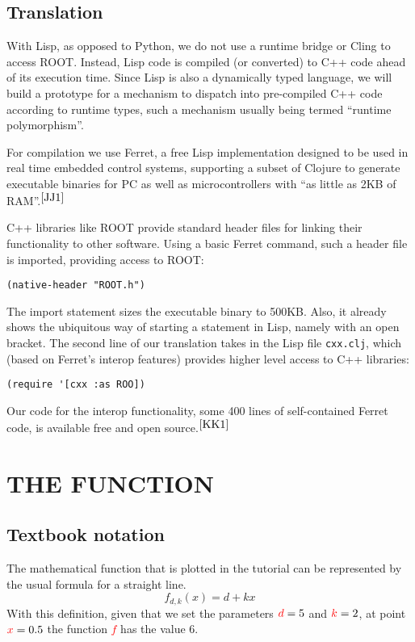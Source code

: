 \documentclass[twocolumn]{article}
\begin{document}
\subsection{Translation}
With Lisp, as opposed to Python, we do not use a runtime bridge or Cling to access ROOT. Instead, Lisp code is compiled (or converted) to C++ code ahead of its execution time. Since Lisp is also a dynamically typed language, we will build a prototype for a mechanism to dispatch into pre-compiled C++ code according to runtime types, such a mechanism usually being termed “runtime polymorphism”.

For compilation we use Ferret, a free Lisp implementation designed to be used in real time embedded control systems, supporting a subset of Clojure  to generate executable binaries for PC as well as microcontrollers with “as little as 2KB of RAM”.$^{\cite{JJ1}}$

C++ libraries like ROOT provide standard header files for linking their functionality to other software. Using a basic Ferret command, such a header file is imported, providing access to ROOT:
{\color{blue}\begin{verbatim}
(native-header "ROOT.h")
\end{verbatim}}
The import statement sizes the executable binary to 500KB. Also, it already shows the ubiquitous way of starting a statement in Lisp, namely with an open bracket. The second line of our translation takes in the Lisp file \texttt{cxx.clj}, which (based on Ferret’s interop features) provides higher level access to C++ libraries:
{\color{blue}\begin{verbatim}
(require '[cxx :as ROO])
\end{verbatim}}
Our code for the interop functionality, some 400 lines of self-contained Ferret code, is available free and open source.$^{\cite{KK1}}$

\section{THE FUNCTION}
\subsection{Textbook notation}
The mathematical function that is plotted in the tutorial can be represented by the usual formula for a straight line.
{\color{red}
\begin{equation}
f_{d,k}(x)=d+kx
\end{equation}}
With this definition, given that we set the parameters \(\textcolor{red}{d} = 5\) and \(\textcolor{red}{k} = 2\), at point \(\textcolor{red}{x} = 0.5\) the function \textcolor{red}{$f$} has the value 6.
\end{document}
